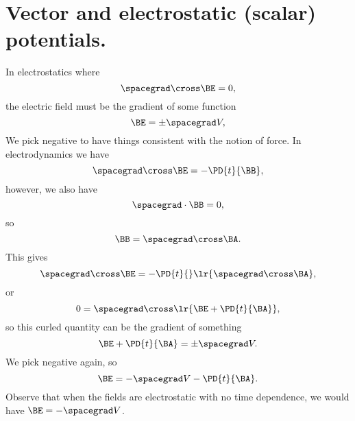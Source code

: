 \section{Vector and electrostatic (scalar) potentials.}
%
In electrostatics where
\begin{equation}\label{eqn:emtLecture10:720}
\spacegrad \cross \BE  = 0,
\end{equation}
%
the electric field must be the gradient of some function
\begin{equation}\label{eqn:emtLecture10:740}
\BE = \pm \spacegrad V,
\end{equation}
%
We pick negative to have things consistent with the notion of force.
%
In electrodynamics we have
\begin{equation}\label{eqn:emtLecture10:760}
\spacegrad \cross \BE = - \PD{t}{\BB},
\end{equation}
%
however, we also have
%
\begin{equation}\label{eqn:emtLecture10:780}
\spacegrad \cdot \BB = 0,
\end{equation}
%
so
\begin{equation}\label{eqn:emtLecture10:800}
\BB = \spacegrad \cross \BA.
\end{equation}
%
This gives
\begin{equation}\label{eqn:emtLecture10:820}
\spacegrad \cross \BE = - \PD{t}{} \lr{ \spacegrad \cross \BA },
\end{equation}
%
or
\begin{equation}\label{eqn:emtLecture10:840}
0 =
\spacegrad \cross \lr{ \BE + \PD{t}{\BA} },
\end{equation}
%
so this curled quantity can be the gradient of something
%
\begin{equation}\label{eqn:emtLecture10:860}
\BE + \PD{t}{\BA} = \pm \spacegrad V.
\end{equation}
%
We pick negative again, so
%
\begin{equation}\label{eqn:emtLecture10:880}
\BE = -\spacegrad V -\PD{t}{\BA}.
\end{equation}
%
Observe that when the fields are electrostatic with no time dependence, we would have \( \BE = -\spacegrad V \).
%
%
\EndNoBibArticle
